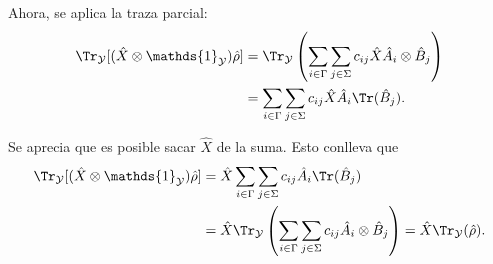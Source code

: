Ahora, se aplica la traza parcial:
\begin{align*}
    \Tr_{\mathcal{Y}}[(\hat{X} \otimes \mathds{1}_{\mathcal{Y}})\hat{\rho}]
    &= \Tr_{\mathcal{Y}}\left(\sum_{i\in\Gamma} \sum_{j\in\Sigma} c_{ij}\hat{X}\hat{A}_{i} \otimes \hat{B}_{j}\right)\\
    &= \sum_{i\in\Gamma} \sum_{j\in\Sigma} c_{ij}\hat{X}\hat{A}_{i} \Tr(\hat{B}_{j}).
\end{align*}

Se aprecia que es posible sacar $\hat{X}$ de la suma. Esto conlleva que
\begin{align*}
    \Tr_{\mathcal{Y}} [(\hat{X} \otimes \mathds{1}_{\mathcal{Y}})\hat{\rho}]
    &= \hat{X} \sum_{i \in \Gamma} \sum_{j \in \Sigma} c_{ij} \hat{A}_{i} \Tr(\hat{B}_{j})\\
    &= \hat{X} \Tr_{\mathcal{Y}} \left(\sum_{i\in\Gamma} \sum_{j \in \Sigma} c_{ij} \hat{A}_{i} \otimes \hat{B}_{j}\right) = \hat{X} \Tr_{\mathcal{Y}} (\hat{\rho}).
\end{align*}

\lipsum[4-4]

